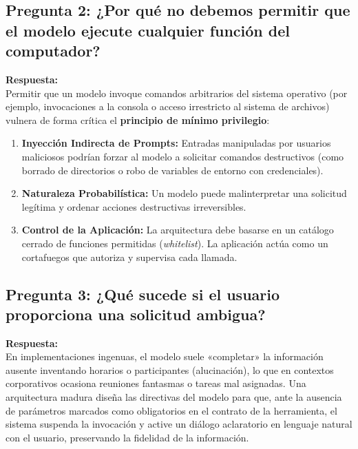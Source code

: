 \documentclass[11pt,a4paper]{article}
\begin{document}
\subsection{Pregunta 2: ¿Por qué no debemos permitir que el modelo ejecute cualquier función del computador?}
\noindent\textbf{Respuesta:}\\
Permitir que un modelo invoque comandos arbitrarios del sistema operativo (por ejemplo, invocaciones a la consola o acceso irrestricto al sistema de archivos) vulnera de forma crítica el \textbf{principio de mínimo privilegio}:
\begin{enumerate}
    \item \textbf{Inyección Indirecta de Prompts:} Entradas manipuladas por usuarios maliciosos podrían forzar al modelo a solicitar comandos destructivos (como borrado de directorios o robo de variables de entorno con credenciales).
    \item \textbf{Naturaleza Probabilística:} Un modelo puede malinterpretar una solicitud legítima y ordenar acciones destructivas irreversibles.
    \item \textbf{Control de la Aplicación:} La arquitectura debe basarse en un catálogo cerrado de funciones permitidas (\textit{whitelist}). La aplicación actúa como un cortafuegos que autoriza y supervisa cada llamada.
\end{enumerate}

\subsection{Pregunta 3: ¿Qué sucede si el usuario proporciona una solicitud ambigua?}
\noindent\textbf{Respuesta:}\\
En implementaciones ingenuas, el modelo suele «completar» la información ausente inventando horarios o participantes (alucinación), lo que en contextos corporativos ocasiona reuniones fantasmas o tareas mal asignadas.
Una arquitectura madura diseña las directivas del modelo para que, ante la ausencia de parámetros marcados como obligatorios en el contrato de la herramienta, el sistema suspenda la invocación y active un diálogo aclaratorio en lenguaje natural con el usuario, preservando la fidelidad de la información.
\end{document}
